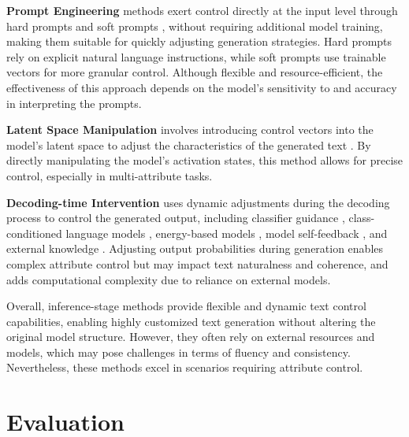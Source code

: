 \documentclass[acmsmall, screen]{acmart}
\begin{document}
\textbf{Prompt Engineering} methods exert control directly at the input level through hard prompts \cite{shin_emnlp20_Autoprompt,ramirez_sigdial23_DAs,zhang_SEM23_PCFG} and soft prompts \cite{li_acl21_PrefixTuning,lester_emnlp21_PromptTuning,liu_arxiv21_PTuning}, without requiring additional model training, making them suitable for quickly adjusting generation strategies. Hard prompts rely on explicit natural language instructions, while soft prompts use trainable vectors for more granular control. Although flexible and resource-efficient, the effectiveness of this approach depends on the model's sensitivity to and accuracy in interpreting the prompts.

\textbf{Latent Space Manipulation} involves introducing control vectors into the model's latent space to adjust the characteristics of the generated text \cite{chan_nips21_GENhance,subramani_acl22_LatentStreeringVectors,liu_arxiv24_ICV,turner_arxiv24_actadd,konen_acl24_StyleVectors}. By directly manipulating the model's activation states, this method allows for precise control, especially in multi-attribute tasks.

\textbf{Decoding-time Intervention} uses dynamic adjustments during the decoding process to control the generated output, including classifier guidance \cite{dathathri_iclr20_PPLM,yang_acl21_fudge,sitdikov_arxiv22_CAIF}, class-conditioned language models \cite{krause_emnlp21_gedi,liu_acl21_DExperts,hallinan_acl23_MARCO}, energy-based models \cite{kumar_nips21_MUCOCO,kumar_emnlp22_MUCOLA,mireshghallah_acl22_mixandmatch}, model self-feedback \cite{schick_tacl21_SD,zhong_arxiv24_ROSE}, and external knowledge \cite{nawezi_tllm23_kNN-CTG,pozzobon_emnlp23_goodtriever}. Adjusting output probabilities during generation enables complex attribute control but may impact text naturalness and coherence, and adds computational complexity due to reliance on external models.

Overall, inference-stage methods provide flexible and dynamic text control capabilities, enabling highly customized text generation without altering the original model structure. However, they often rely on external resources and models, which may pose challenges in terms of fluency and consistency. Nevertheless, these methods excel in scenarios requiring attribute control.

\section{Evaluation}
\label{sec:ctg_eval}
\end{document}
